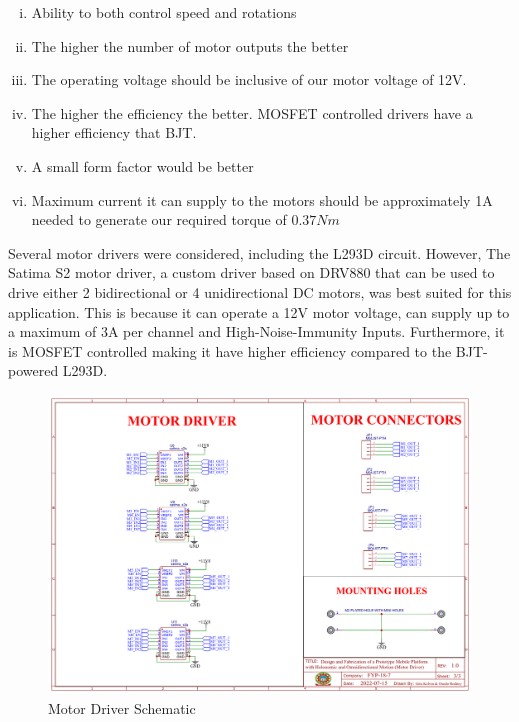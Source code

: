 \begin{enumerate}[i.]
    \item Ability to both control speed and rotations
    \item The higher the number of motor outputs the better
    \item The operating voltage should be inclusive of our motor voltage of 12V.
    \item The higher the efficiency the better. \ac{MOSFET} controlled drivers have a higher efficiency that \ac{BJT}.
    \item A small form factor would be better
    \item Maximum current it can supply to the motors should be approximately 1A needed to generate our required torque of $0.37 N m$
\end{enumerate}

Several motor drivers were considered, including the L293D circuit. However, The Satima S2 motor driver, a custom driver based on DRV880 that can be used to drive either 2 bidirectional or 4 unidirectional DC motors, was best suited for this application. This is because it can operate a 12V motor voltage, can supply up to a maximum of 3A per channel and High-Noise-Immunity Inputs. Furthermore, it is \ac{MOSFET} controlled making it have higher efficiency compared to the \ac{BJT}-powered L293D.

\begin{figure}[H]
    \centering
    \includegraphics[scale = 0.4]{Figures/MPmotorDriver.png}
    \caption{Motor Driver Schematic}
    \label{fig:motordriverschematic}
\end{figure}


